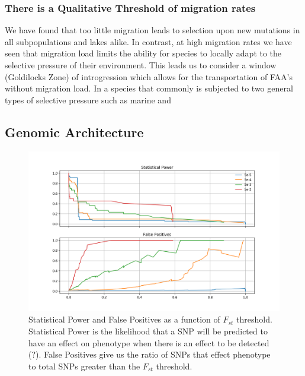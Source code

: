 \documentclass{article}
\begin{document}

	
\subsubsection*{There is a Qualitative Threshold of migration rates}


We have found that too little migration leads to selection upon new mutations in all subpopulations and lakes alike. 
In contrast, at high migration rates we have seen that migration load limits 
the ability for species to locally adapt to the selective pressure of their environment.
This leads us to consider a window (Goldilocks Zone) of introgression which allows for the transportation
of FAA's without migration load. In a species that commonly is subjected to two general types of selective pressure 
such as marine and 


\subsection{Genomic Architecture}

\begin{figure}
	\begin{center}
  		\includegraphics[width=0.7\linewidth]{matplotlibPlots/Power_FP.png}
  		\caption{ 
		Statistical Power and False Positives as a function of $F_{st}$ threshold. 
		Statistical Power is the likelihood that a SNP will be predicted to have an effect on phenotype when there is an effect to be detected (?).
		False Positives give us the ratio of SNPs that effect phenotype to total SNPs greater than the $F_{st}$ threshold.
		}
  		\label{fig:Power_FP}
	\end{center}
\end{figure}
\end{document}

